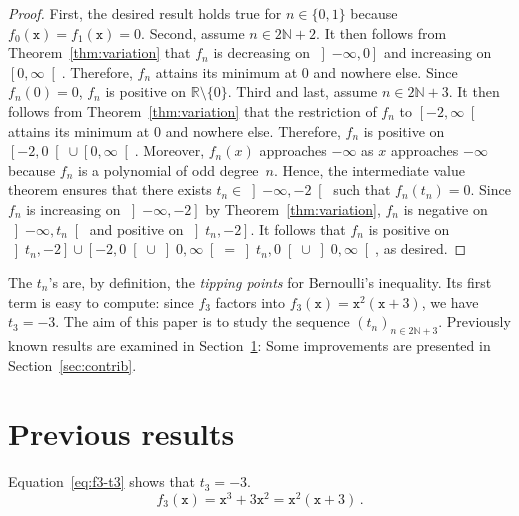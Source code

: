 \documentclass[12pt]{article}
\newcommand{\bR}{\mathbb{R}}
\newcommand{\bN}{\mathbb{N}}
\newcommand{\gtint}[1]{\left] #1, \infty \right[}
\newcommand{\geint}[1]{\left[ #1, \infty \right[}
\newcommand{\ltint}[1]{\left]- \infty, #1 \right[}
\newcommand{\leint}[1]{\left]- \infty, #1 \right]}
\newcommand{\ttx}{\mathtt{x}}
\begin{document}
 \begin{proof}
   First, the desired result holds true for $n \in \{ 0, 1 \}$ because $f_0(\ttx) = f_1(\ttx) = 0$.
   Second, assume $n \in  2 \bN + 2$.
   It then follows from Theorem~\ref{thm:variation} that 
   $f_n$ is decreasing on $\leint{0}$ and increasing on $\geint{0}$.
   Therefore, $f_n$ attains its minimum at $0$ and nowhere else. 
   Since $f_n(0) = 0$, $f_n$ is positive on $\bR \setminus \{ 0 \}$.
   Third and last, assume $n \in 2 \bN + 3$.
   It then follows from Theorem~\ref{thm:variation} that
   the restriction of $f_n$ to $\geint{-2}$ attains its minimum at $0$
   and nowhere else.
   Therefore, $f_n$ is positive on $\left[- 2, 0\right[ \cup \geint{0}$.  
   Moreover,
   $f_n(x)$ approaches $- \infty$ as $x$ approaches $- \infty$
   because $f_n$ is a polynomial of odd degree~$n$.
   Hence,
   the intermediate value theorem ensures that there exists $t_n \in \ltint{- 2}$ such that $f_n(t_n) = 0$.
   Since $f_n$ is increasing on $\leint{- 2}$ by Theorem~\ref{thm:variation},
   $f_n$ is negative on $\ltint{t_n}$ and positive on $\left]t_n, - 2 \right]$.
   It follows that $f_n$ is positive on
   $\left]t_n, - 2 \right] \cup \left[- 2, 0 \right[ \cup \gtint{0}
   =
   \left]t_n, 0 \right[ \cup \gtint{0}$,
   as desired.
 \end{proof}
 
 The $t_n$'s are, by definition, the \emph{tipping points} for Bernoulli's inequality.
 Its first term is easy to compute:
 since $f_3$ factors into $f_3(\ttx) = \ttx^2( \ttx + 3)$,
 we have $t_3 = - 3$.
 The aim of this paper is to study the sequence $\left( t_n \right)_{n \in 2 \bN + 3}$.
 Previously known results are examined in Section~\ref{sec:bulgar}:
 Some improvements are presented in Section~\ref{sec:contrib}.

 
 
 \section{Previous results} \label{sec:bulgar} 

 

 Equation~\eqref{eq:f3-t3} shows that $t_3 = - 3$. 
 \begin{equation} \label{eq:f3-t3}
f_3(\ttx) = \ttx^3 + 3 \ttx^2 = \ttx^2 (\ttx + 3) \,.
\end{equation}
\end{document}
